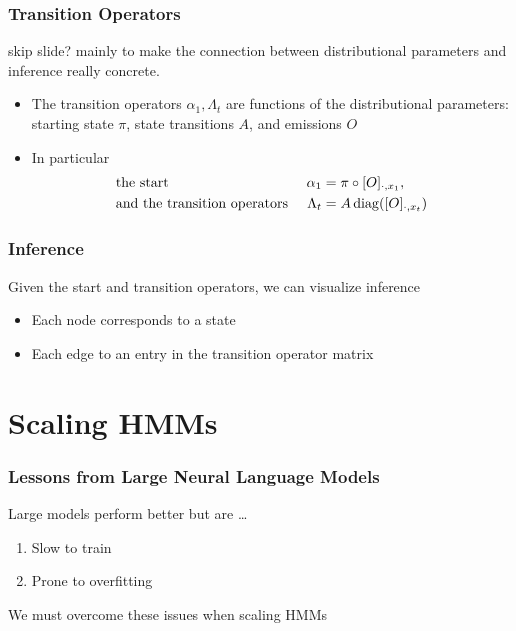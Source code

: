 \documentclass{beamer}
\begin{document}
\begin{frame}
\frametitle{Transition Operators}
skip slide? mainly to make the connection between distributional parameters
and inference really concrete.
\begin{itemize}
    \item The transition operators $\alpha_1,\Lambda_t$ are functions of
        the distributional parameters: starting state $\pi$, state transitions $A$,
            and emissions $O$
    \vspace{1em}
    \item In particular
\begin{align*}
&\textnormal{the start } & \alpha_1 &= \pi \circ [O]_{\cdot,x_1},\\
&\textnormal{and the transition operators }
    & \Lambda_t &= A\operatorname{diag}([O]_{\cdot, x_t})
\end{align*}
\end{itemize}
\end{frame}

\begin{frame}
\frametitle{Inference}
Given the start and transition operators, we can visualize inference
\begin{figure}
\begin{center}
\resizebox{0.8\width}{0.8\height}{

}
\end{center}
\end{figure}
\vspace{-1em}
\begin{itemize}
    \item Each node corresponds to a state
    \item Each edge to an entry in the transition operator matrix
\end{itemize}
\end{frame}

\section{Scaling HMMs}

\begin{frame}
\frametitle{Lessons from Large Neural Language Models}

Large models perform better but are \ldots
\vspace{2em}
\begin{enumerate}
\item Slow to train
\vspace{2em}
\item Prone to overfitting
\end{enumerate}
\vspace{2em}
We must overcome these issues when scaling HMMs
\end{frame}
\end{document}

